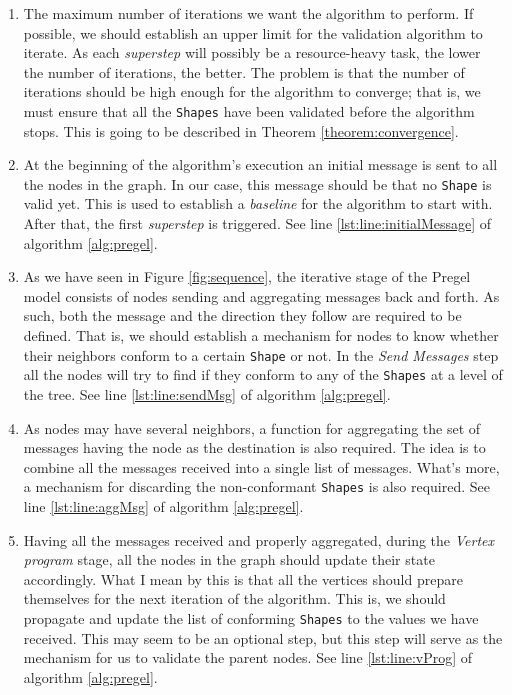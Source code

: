 \begin{enumerate}[label=(\roman*)]
    \itemsep0.5em
    \item The maximum number of iterations we want the algorithm to perform. If possible, we should establish an upper limit for the validation algorithm to iterate. As each \textit{superstep} will possibly be a resource-heavy task, the lower the number of iterations, the better. The problem is that the number of iterations should be high enough for the algorithm to converge; that is, we must ensure that all the \texttt{Shapes} have been validated before the algorithm stops. This is going to be described in Theorem \ref{theorem:convergence}.
    \item At the beginning of the algorithm's execution an initial message is sent to all the nodes in the graph. In our case, this message should be that no \texttt{Shape} is valid yet. This is used to establish a \textit{baseline} for the algorithm to start with. After that, the first \textit{superstep} is triggered. See line \ref{lst:line:initialMessage} of algorithm \ref{alg:pregel}.
    \item As we have seen in Figure \ref{fig:sequence}, the iterative stage of the Pregel model consists of nodes sending and aggregating messages back and forth. As such, both the message and the direction they follow are required to be defined. That is, we should establish a mechanism for nodes to know whether their neighbors conform to a certain \texttt{Shape} or not. In the \textit{Send Messages} step all the nodes will try to find if they conform to any of the \texttt{Shapes} at a level of the tree. See line \ref{lst:line:sendMsg} of algorithm \ref{alg:pregel}.
    \item As nodes may have several neighbors, a function for aggregating the set of messages having the node as the destination is also required. The idea is to combine all the messages received into a single list of messages. What's more, a mechanism for discarding the non-conformant \texttt{Shapes} is also required. See line \ref{lst:line:aggMsg} of algorithm \ref{alg:pregel}.
    \item Having all the messages received and properly aggregated, during the \textit{Vertex program} stage, all the nodes in the graph should update their state accordingly. What I mean by this is that all the vertices should prepare themselves for the next iteration of the algorithm. This is, we should propagate and update the list of conforming \texttt{Shapes} to the values we have received. This may seem to be an optional step, but this step will serve as the mechanism for us to validate the parent nodes. See line \ref{lst:line:vProg} of algorithm \ref{alg:pregel}.
\end{enumerate}

